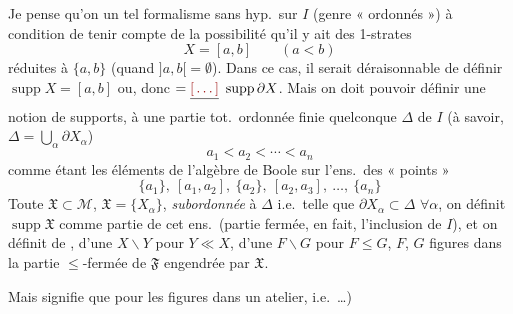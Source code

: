 \documentclass[11pt,a4paper]{article}
\begin{document}
Je pense qu'on  un tel formalisme sans hyp.\ sur $I$ (genre «  ordonnés ») à condition de tenir compte de la possibilité qu'il y ait des 1-strates
\[
  X = [a,b] \qquad (a < b)
\]
réduites à $\lbrace a, b \rbrace$ (quand $]a,b[ = \emptyset$). Dans ce cas, il serait déraisonnable de définir $\operatorname{supp} X = [a,b]$ ou, donc $= \struck{\ill{}}\ \operatorname{supp} \partial X$. Mais on doit pouvoir définir une notion de supports,  à une partie tot.\ ordonnée finie quelconque $\Delta$ de $I$ (à savoir, $\Delta = \bigcup_\alpha \partial X_\alpha$)
\[
  a_1 < a_2 < \cdots < a_n
\]
comme étant \struck{\ill{}} les éléments de l'algèbre de Boole sur l'ens.\ des « points »
\[
  \lbrace a_1 \rbrace ,\ [a_1, a_2] ,\ \lbrace a_2 \rbrace ,\ [a_2, a_3] ,\ \ldots ,\ \lbrace a_n \rbrace
\]
 Toute  $\mathfrak{X} \subset \mathcal{M}$, $\mathfrak{X} = \lbrace X_\alpha \rbrace$, \emph{subordonnée} à $\Delta$ i.e.\ telle que $\partial X_\alpha \subset \Delta$ $\forall \alpha$, on définit $\operatorname{supp} \mathfrak{X}$ comme partie de cet ens.\ (partie  fermée, en fait, \ill{} \ill{} \ill{} \ill{} l'inclusion \ill{} \ill{} de $I$), et on définit de  \ill{} , d'une   $X \smallsetminus Y$ pour $Y \ll X$, d'une  $F \smallsetminus G$ pour $F \leq G$, $F$, $G$ figures dans la \struck{\ill{}} partie $\leq$-fermée de $\mathfrak{F}$ engendrée par $\mathfrak{X}$.

Mais  signifie  que pour \struck{\ill{}} les figures dans un atelier, i.e.\ \quad \ldots )
\end{document}
